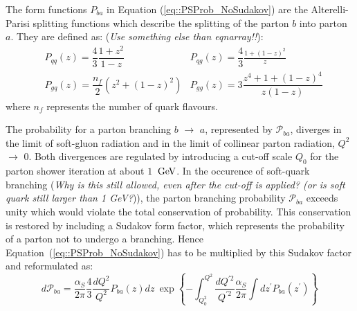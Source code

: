 The form functions $P_{ba}$ in Equation (\ref{eq::PSProb_NoSudakov}) are the Alterelli-Parisi splitting functions which describe the splitting of the parton $b$ into parton $a$. They are defined as: \cite{} (\textit{Use something else than eqnarray!!}):
\begin{eqnarray}
 & P_{qq}(z) = \dfrac{4}{3} \dfrac{1+z^{2}}{1-z} & P_{qg}(z) = \dfrac{4}{3} \frac{1+(1-z)^{2}}{z} \\
 & P_{gq}(z) = \dfrac{n_{f}}{2} (z^{2} + (1-z)^{2}) & P_{gg}(z) = 3 \dfrac{z^{4}+1+(1-z)^{4}}{z(1-z)}
\end{eqnarray}
where $n_{f}$ represents the number of quark flavours.

The probability for a parton branching $b$ $\rightarrow$ $a$, represented by $\mathcal{P}_{ba}$, diverges in the limit of soft-gluon radiation
and in the limit of collinear parton radiation, $Q^{2}$ $\rightarrow$ $0$.
Both divergences are regulated by introducing a cut-off scale $Q_{0}$ for the parton shower iteration at about $1$ $\, \mathrm{GeV}$. In the occurence of soft-quark branching (\textit{Why is this still allowed, even after the cut-off is applied? (or is soft quark still larger than 1 GeV?})), the parton branching probability $\mathcal{P}_{ba}$ exceeds unity which would violate the total conservation of probability. This conservation is restored by including a Sudakov form factor, which represents the probability of a parton not to undergo a branching. Hence Equation~(\ref{eq::PSProb_NoSudakov}) has to be multiplied by this Sudakov factor and reformulated as:
\begin{equation}
 d\mathcal{P}_{ba} = \dfrac{\alpha_{S}}{2\pi} \dfrac{4}{3} \dfrac{dQ^{2}}{Q^{2}} P_{ba}(z)dz ~ \exp \left\lbrace - \int_{Q_{0}^{2}}^{Q^{2}} \dfrac{dQ^{'2}}{Q^{'2}} \dfrac{\alpha_{S}}{2\pi} \int dz^{'} P_{ba}(z^{'})  \right\rbrace
\end{equation}

